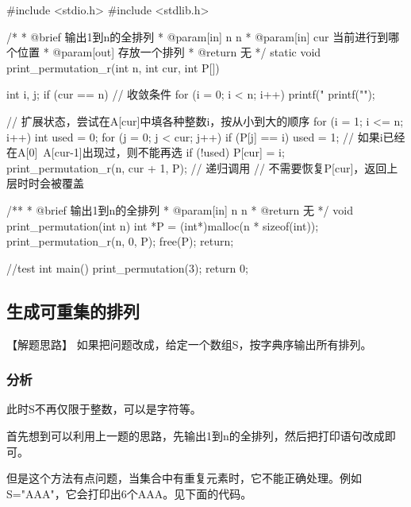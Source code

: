 \begin{Codex}[label=print_permutation_n.c]
#include <stdio.h>
#include <stdlib.h>

/*
 * @brief 输出1到n的全排列
 * @param[in] n n
 * @param[in] cur 当前进行到哪个位置
 * @param[out] 存放一个排列
 * @return 无
 */
static void print_permutation_r(int n, int cur, int P[]) {
    int i, j;
    if (cur == n) { // 收敛条件
        for (i = 0; i < n; i++)
            printf("%
        printf("\n");
    }

    // 扩展状态，尝试在A[cur]中填各种整数i，按从小到大的顺序
    for (i = 1; i <= n; i++) {
        int used = 0;
        for (j = 0; j < cur; j++)
            if (P[j] == i)
                used = 1; // 如果i已经在A[0]~A[cur-1]出现过，则不能再选
        if (!used) {
            P[cur] = i;
            print_permutation_r(n, cur + 1, P); // 递归调用
            // 不需要恢复P[cur]，返回上层时时会被覆盖
        }
    }
}

/**
 * @brief 输出1到n的全排列
 * @param[in] n n
 * @return 无
 */
void print_permutation(int n) {
    int *P = (int*)malloc(n * sizeof(int));
    print_permutation_r(n, 0, P);
    free(P);
    return;
}

//test
int main() {
    print_permutation(3);
    return 0;
}
\end{Codex}


\subsection{生成可重集的排列}

【解题思路】
如果把问题改成，给定一个数组S，按字典序输出所有排列。

\subsubsection{分析}
此时S不再仅限于整数，可以是字符等。

首先想到可以利用上一题的思路，先输出1到n的全排列，然后把打印语句改成即可。

但是这个方法有点问题，当集合中有重复元素时，它不能正确处理。例如S="AAA"，它会打印出6个AAA。见下面的代码。

